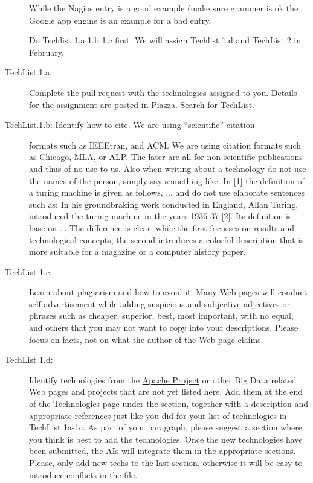 \begin{description}
While the Nagios entry is a good example (make sure grammer is ok
the Google app engine is an example for a bad entry.

Do Techlist 1.a 1.b 1.c first. We  will assign Techlist 1.d and
TechList 2 in February.

\item[{TechList.1.a:}] \leavevmode
Complete the pull request with the technologies assigned to you.
Details for the assignment are posted in Piazza. Search for TechList.

\item[{TechList.1.b: Identify how to cite. We are using ``scientific'' citation}] \leavevmode
formats such as IEEEtran, and ACM. We are  using citation
formats such as Chicago, MLA, or ALP. The later are all for non
scientific publications and thus of no use to us. Also when writing
about a technology do not use the names of the person, simply say
something like. In {[}1{]} the definition of a turing machine is given
as follows, ...  and do not use elaborate sentences such as: In his
groundbraking work conducted in England, Allan Turing, introduced
the turing machine in the years 1936-37 {[}2{]}. Its definition is base
on ... The difference is clear, while the first focusses on results
and technological concepts, the second introduces a colorful
description that is more suitable for a magazine or a computer
history paper.

\item[{TechList 1.c:}] \leavevmode
Learn about plagiarism and how to avoid it.
Many Web pages will conduct self advertisement while adding
suspicious and subjective adjectives or phrases such as cheaper,
superior, best, most important, with no equal, and others that you
may not want to copy into your descriptions. Please focus on facts,
not on what the author of the Web page claims.

\item[{TechList 1.d:}] \leavevmode
Identify technologies from the \href{https://projects.apache.org/}{Apache Project} or other Big Data related Web pages
and projects that are not yet listed here. Add them at the end of
the Technologies page under the {\hyperref[\detokenize{i524/technologies:new-techs}]{}}
section, together with a description and appropriate references just
like you did for your list of technologies in TechList 1a-1c. As
part of your paragraph, please suggest a section where you think is
best to add the technologies. Once the new technologies have been
submitted, the AIs will integrate them in the appropriate
sections. Please, only add new techs to the last section, otherwise
it will be easy to introduce conflicts in the file.


\end{description}
